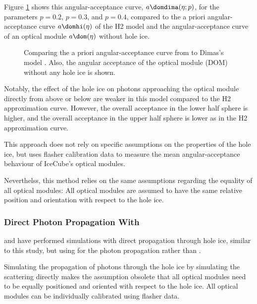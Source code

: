 Figure \ref{fig:Vohn9Oov} shows this angular-acceptance curve, $a\domdima(\eta;p)$, for the parameters $p=0.2$, $p=0.3$, and $p=0.4$, compared to the a priori angular-acceptance curve $a\domhi(\eta)$ of the H2 model and the angular-acceptance curve of an optical module $a\dom(\eta)$ without hole ice.

\begin{figure}[htbp]
  \caption{Comparing the a priori angular-acceptance curve from \cite{icepaper} to Dimas's model \cite{flasherdataderivedicemodels}. Also, the angular acceptance of the optical module (DOM) without any hole ice is shown.}
  \label{fig:Vohn9Oov}
\end{figure}

Notably, the effect of the hole ice on photons approaching the optical module directly from above or below are weaker in this model compared to the H2 approximation curve. However, the overall acceptance in the lower half sphere is higher, and the overall acceptance in the upper half sphere is lower as in the H2 approximation curve.

This approach does not rely on specific assumptions on the properties of the hole ice, but uses flasher calibration data to measure the mean angular-acceptance behaviour of IceCube's optical modules.

Neverthelss, this method relies on the same assumptions regarding the equality of all optical modules: All optical modules are assumed to have the same relative position and orientation with respect to the hole ice.


\subsubsection{Direct Photon Propagation With \ppc}

\chirkin and \rongen have performed simulations with direct propagation through hole ice, similar to this study, but using \ppc for the photon propagation rather than \clsim. \cite{martinspicehddard}\cite{martindardupdate}\cite{pocam}\cite{icrc17pocam}\cite{ppcpaper}


Simulating the propagation of photons through the hole ice by simulating the scattering directly makes the assumption obsolete that all optical modules need to be equally positioned and oriented with respect to the hole ice. All optical modules can be individually calibrated using flasher data. \cite{martinspicehddard}

